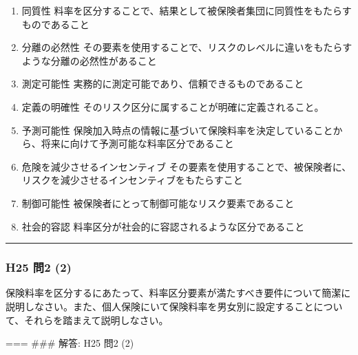 \documentclass[
]{article}
\providecommand{\tightlist}{%
  \setlength{\itemsep}{0pt}\setlength{\parskip}{0pt}}
\begin{document}
\begin{enumerate}
\def\labelenumi{\arabic{enumi}.}
\tightlist
\item
  同質性
  料率を区分することで、結果として被保険者集団に同質性をもたらすものであること
\item
  分離の必然性
  その要素を使用することで、リスクのレベルに違いをもたらすような分離の必然性があること
\item
  測定可能性 実務的に測定可能であり、信頼できるものであること
\item
  定義の明確性 そのリスク区分に属することが明確に定義されること。
\item
  予測可能性
  保険加入時点の情報に基づいて保険料率を決定していることから、将来に向けて予測可能な料率区分であること
\item
  危険を減少させるインセンティブ
  その要素を使用することで、被保険者に、リスクを減少させるインセンティブをもたらすこと
\item
  制御可能性 被保険者にとって制御可能なリスク要素であること
\item
  社会的容認 料率区分が社会的に容認されるような区分であること
\end{enumerate}

\begin{center}\rule{0.5\linewidth}{0.5pt}\end{center}

\hypertarget{h25-ux554f2-2}{%
\subsubsection{H25 問2 (2)}\label{h25-ux554f2-2}}

保険料率を区分するにあたって、料率区分要素が満たすべき要件について簡潔に説明しなさい。また、個人保険にいて保険料率を男女別に設定することについて、それらを踏まえて説明しなさい。

=== \#\#\# 解答: H25 問2 (2)
\end{document}

